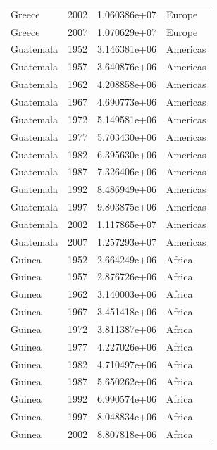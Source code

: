 \documentclass[
  letterpaper,
  DIV=11,
  numbers=noendperiod]{scrreprt}
\begin{document}
\begin{tcolorbox}
\begin{tabular}{lrrl}
Greece                   &  2002 &  1.060386e+07 &    Europe \\
Greece                   &  2007 &  1.070629e+07 &    Europe \\
Guatemala                &  1952 &  3.146381e+06 &  Americas \\
Guatemala                &  1957 &  3.640876e+06 &  Americas \\
Guatemala                &  1962 &  4.208858e+06 &  Americas \\
Guatemala                &  1967 &  4.690773e+06 &  Americas \\
Guatemala                &  1972 &  5.149581e+06 &  Americas \\
Guatemala                &  1977 &  5.703430e+06 &  Americas \\
Guatemala                &  1982 &  6.395630e+06 &  Americas \\
Guatemala                &  1987 &  7.326406e+06 &  Americas \\
Guatemala                &  1992 &  8.486949e+06 &  Americas \\
Guatemala                &  1997 &  9.803875e+06 &  Americas \\
Guatemala                &  2002 &  1.117865e+07 &  Americas \\
Guatemala                &  2007 &  1.257293e+07 &  Americas \\
Guinea                   &  1952 &  2.664249e+06 &    Africa \\
Guinea                   &  1957 &  2.876726e+06 &    Africa \\
Guinea                   &  1962 &  3.140003e+06 &    Africa \\
Guinea                   &  1967 &  3.451418e+06 &    Africa \\
Guinea                   &  1972 &  3.811387e+06 &    Africa \\
Guinea                   &  1977 &  4.227026e+06 &    Africa \\
Guinea                   &  1982 &  4.710497e+06 &    Africa \\
Guinea                   &  1987 &  5.650262e+06 &    Africa \\
Guinea                   &  1992 &  6.990574e+06 &    Africa \\
Guinea                   &  1997 &  8.048834e+06 &    Africa \\
Guinea                   &  2002 &  8.807818e+06 &    Africa \\

\end{tabular}
\end{tcolorbox}
\end{document}

